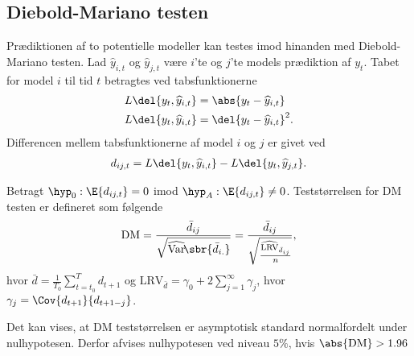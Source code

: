 \subsection{Diebold-Mariano testen}
Prædiktionen af to potentielle modeller kan testes imod hinanden med Diebold-Mariano testen.
Lad \(\widehat{y}_{i,t}\) og \(\widehat{y}_{j,t}\) være \(i\)'te og \(j\)'te models prædiktion af \(y_{t}\).
Tabet for model \(i\) til tid \(t\) betragtes ved tabsfunktionerne
\begin{align}
L \del{y_t, \widehat{y}_{i,t}} &= \abs{y_t - \widehat{y}_{i,t}} \label{eq:lossMAE} \\
L \del{y_t, \widehat{y}_{i,t}} &= \del{y_t - \widehat{y}_{i,t}}^2. \label{eq:lossMSE}
\end{align}
Differencen mellem tabsfunktionerne af model \(i\) og \(j\) er givet ved 
\begin{align*}
d_{ij,t} = L \del{y_t, \widehat{y}_{i,t}} - L \del{y_t, \widehat{y}_{j,t}}.
\end{align*}
%
\begin{defn}
Betragt \(\hyp_0 : \E{d_{ij,t}} = 0\) imod \(\hyp_A: \E{d_{ij,t}} \neq 0\). Teststørrelsen for DM testen er defineret som følgende
\begin{align*}
\text{DM} = \frac{\bar{d}_{ij}}{\sqrt{\widehat{\mathrm{Var}}\!\sbr{\bar{d}_{i.}}}} =  \frac{\bar{d}_{ij}}{\sqrt{\frac{\widehat{\text{LRV}}_{\bar{d}_{ij}}}{n}}},
\end{align*}
hvor $\bar{d} = \frac{1}{T_0} \sum^{T}_{t = t_0} d_{t +1} $ og $\text{LRV}_{\bar{d}} = \gamma_0 + 2\sum_{j = 1}^{\infty} \gamma_j$, hvor $\gamma_j = \Cov{d_{t +1}}{d_{t+1-j}}$. 
\end{defn}
%
Det kan vises, at DM teststørrelsen er asymptotisk standard normalfordelt under nulhypotesen. Derfor afvises nulhypotesen ved niveau $5 \%$, hvis $\abs{\text{DM}} > 1.96$